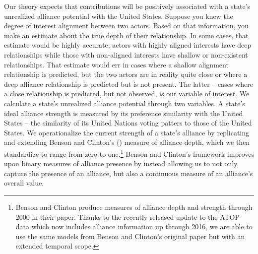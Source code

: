 \documentclass[12pt,letterpaper]{article}
\begin{document}
		Our theory expects that contributions will be positively associated with a state's unrealized alliance potential with the United States. Suppose you knew the degree of interest alignment between two actors. Based on that information, you make an estimate about the true depth of their relationship. In some cases, that estimate would be highly accurate; actors with highly aligned interests have deep relationships while those with non-aligned interests have shallow or non-existent relationships. That estimate would err in cases where a shallow alignment relationship is predicted, but the two actors are in reality quite close or where a deep alliance relationship is predicted but is not present. The latter -- cases where a close relationship is predicted, but not observed, is our variable of interest. We calculate a state's unrealized alliance potential through two variables. A state's ideal alliance strength is measured by its preference similarity with the United States -- the similarity of its United Nations voting patters to those of the United States. We operationalize the current strength of a state's alliance by replicating and extending Benson and Clinton's (\citeyear{benson_assessingvariationformal_2016}) measure of alliance depth, which we then standardize to range from zero to one.\footnote{Benson and Clinton produce measures of alliance depth and strength through 2000 in their paper. Thanks to the recently released update to the ATOP data \citep{leeds_alliancetreatyobligations_2002} which now includes alliance information up through 2016, we are able to use the same models from Benson and Clinton's original paper but with an extended temporal scope.} Benson and Clinton's framework improves upon binary measures of alliance presence by instead allowing us to not only capture the presence of an alliance, but also a continuous measure of an alliance's overall value.
\end{document}
